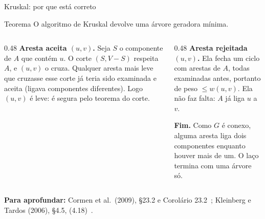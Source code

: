 \documentclass[aspectratio=169,xcolor=table]{beamer}
\newcommand{\fonte}[1]{%
  \vfill
  {\tiny\color{gray!55!black}\textbf{Para aprofundar:} #1\par}%
}
\begin{document}
\begin{frame}{Kruskal: por que está correto}
  \begin{block}{Teorema}
    \small O algoritmo de Kruskal devolve uma árvore geradora mínima.
  \end{block}
  \begin{columns}[T]
    \begin{column}{0.48\textwidth}
      \scriptsize
      \textbf{Aresta aceita $(u,v)$.} Seja $S$ o componente de $A$ que contém $u$. O corte
      $(S, V - S)$ respeita $A$, e $(u,v)$ o cruza. Qualquer aresta mais leve que cruzasse
      esse corte já teria sido examinada e aceita (ligava componentes diferentes). Logo
      $(u,v)$ é leve: é segura pelo teorema do corte.
    \end{column}
    \begin{column}{0.48\textwidth}
      \scriptsize
      \textbf{Aresta rejeitada $(u,v)$.} Ela fecha um ciclo com arestas de $A$, todas
      examinadas antes, portanto de peso $\le w(u,v)$. Ela não faz falta: $A$ já liga $u$
      a $v$.
      \medskip

      \textbf{Fim.} Como $G$ é conexo, alguma aresta liga dois componentes enquanto houver
      mais de um. O laço termina com uma árvore só.
    \end{column}
  \end{columns}
  \fonte{Cormen et al.\ (2009), \S 23.2 e Corolário 23.2~\cite{cormen2009introduction};
    Kleinberg e Tardos (2006), \S 4.5, (4.18)~\cite{kleinberg2006algorithm}.}
\end{frame}
\end{document}
